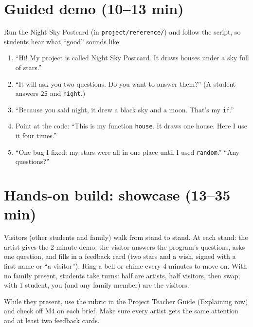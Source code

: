 \section{Guided demo (10--13 min)}
\begin{workedexample}
Run the Night Sky Postcard (in \texttt{project/reference/}) and follow the script, so students hear what \enquote{good} sounds like:
\begin{enumerate}[leftmargin=1.4em,itemsep=1pt]
  \item \enquote{Hi! My project is called Night Sky Postcard. It draws houses under a sky full of stars.}
  \item \enquote{It will ask you two questions. Do you want to answer them?} (A student answers \texttt{25} and \texttt{night}.)
  \item \enquote{Because you said night, it drew a black sky and a moon. That's my \texttt{if}.}
  \item Point at the code: \enquote{This is my function \texttt{house}. It draws one house. Here I use it four times.}
  \item \enquote{One bug I fixed: my stars were all in one place until I used \texttt{random}.} \enquote{Any questions?}
\end{enumerate}
\end{workedexample}

\section{Hands-on build: showcase (13--35 min)}
\begin{unplugged}
Visitors (other students and family) walk from stand to stand. At each stand: the artist gives the 2-minute demo, the visitor answers the program's questions, asks one question, and fills in a feedback card (two stars and a wish, signed with a first name or \enquote{a visitor}). Ring a bell or chime every 4 minutes to move on. With no family present, students take turns: half are artists, half visitors, then swap; with 1 student, you (and any family member) are the visitors.
\end{unplugged}
While they present, use the rubric in the Project Teacher Guide (Explaining row) and check off M4 on each brief. Make sure every artist gets the same attention and at least two feedback cards.

